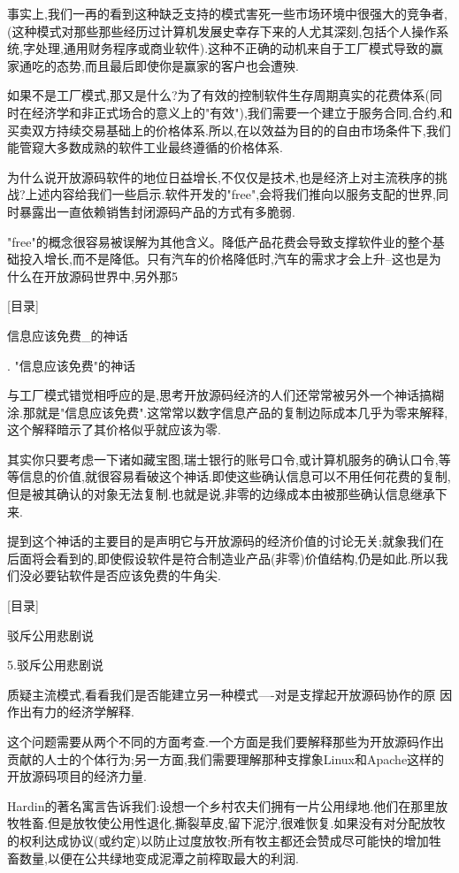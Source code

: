 \documentclass[a4paper,12pt,UTF8,twoside]{ctexbook}
\begin{document}
事实上,我们一再的看到这种缺乏支持的模式害死一些市场环境中很强大的竞争者,(这种模式对那些那些经历过计算机发展史幸存下来的人尤其深刻,包括个人操作系统,字处理,通用财务程序或商业软件).这种不正确的动机来自于工厂模式导致的赢家通吃的态势,而且最后即使你是赢家的客户也会遭殃.


如果不是工厂模式,那又是什么?为了有效的控制软件生存周期真实的花费体系(同时在经济学和非正式场合的意义上的"有效"),我们需要一个建立于服务合同,合约,和买卖双方持续交易基础上的价格体系.所以,在以效益为目的的自由市场条件下,我们能管窥大多数成熟的软件工业最终遵循的价格体系.


为什么说开放源码软件的地位日益增长,不仅仅是技术,也是经济上对主流秩序的挑战?上述内容给我们一些启示.软件开发的"free",会将我们推向以服务支配的世界,同时暴露出一直依赖销售封闭源码产品的方式有多脆弱.


"free"的概念很容易被误解为其他含义。降低产品花费会导致支撑软件业的整个基础投入增长,而不是降低。只有汽车的价格降低时,汽车的需求才会上升--这也是为什么在开放源码世界中,另外那5%

[目录]

信息应该免费_的神话

. "信息应该免费"的神话

与工厂模式错觉相呼应的是,思考开放源码经济的人们还常常被另外一个神话搞糊涂.那就是"信息应该免费".这常常以数字信息产品的复制边际成本几乎为零来解释,这个解释暗示了其价格似乎就应该为零.


其实你只要考虑一下诸如藏宝图,瑞士银行的账号口令,或计算机服务的确认口令,等等信息的价值,就很容易看破这个神话.即使这些确认信息可以不用任何花费的复制,但是被其确认的对象无法复制.也就是说,非零的边缘成本由被那些确认信息继承下来.


提到这个神话的主要目的是声明它与开放源码的经济价值的讨论无关;就象我们在后面将会看到的,即使假设软件是符合制造业产品(非零)价值结构,仍是如此.所以我们没必要钻软件是否应该免费的牛角尖.

[目录]

驳斥公用悲剧说

5.驳斥公用悲剧说

质疑主流模式,看看我们是否能建立另一种模式----对是支撑起开放源码协作的原 因作出有力的经济学解释.


这个问题需要从两个不同的方面考查.一个方面是我们要解释那些为开放源码作出 贡献的人士的个体行为;另一方面,我们需要理解那种支撑象Linux和Apache这样的 开放源码项目的经济力量.


Hardin的著名寓言告诉我们:设想一个乡村农夫们拥有一片公用绿地.他们在那里放牧牲畜.但是放牧使公用性退化,撕裂草皮,留下泥泞,很难恢复.如果没有对分配放牧的权利达成协议(或约定)以防止过度放牧;所有牧主都还会赞成尽可能快的增加牲畜数量,以便在公共绿地变成泥潭之前榨取最大的利润.
\end{document}
